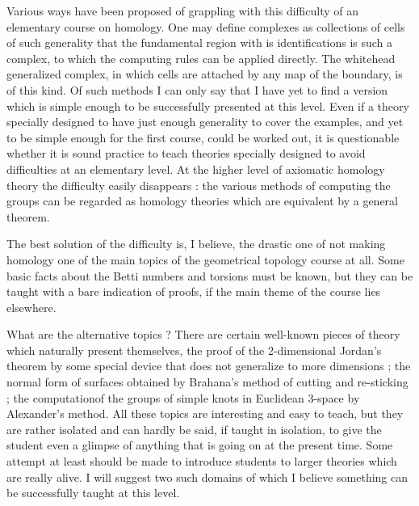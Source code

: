 Various ways have been proposed of grappling with this difficulty of
an elementary course on homology. One may define complexes as
collections of cells of such generality that the fundamental region
with is identifications is such a complex, to which the computing
rules can be applied directly. The whitehead generalized complex, in
which cells are attached by any map of the boundary, is of this
kind. Of such methods I can only say that I have yet to find a version
which is simple enough to be successfully presented at this
level. Even if a theory specially designed to have just enough
generality to cover the examples, and yet to be simple enough for the
first course, could be worked out, it is questionable whether it is
sound practice to teach theories specially designed to avoid
difficulties at an elementary level. At the higher level of axiomatic
homology theory the difficulty easily disappears : the various methods
of computing the groups can be regarded as homology theories which are
equivalent by a general theorem.

The best solution of the difficulty is, I believe, the drastic one of
not making homology one of the main topics of the geometrical topology
course at all. Some basic facts about the Betti numbers and torsions
must be known, but they can be taught with a bare indication of
proofs, if the main theme of the course lies elsewhere.

What are the alternative topics ? There are certain well-known pieces
of theory which naturally present themselves, the proof of the
2-dimensional Jordan's theorem by some special device that does not
generalize to more dimensions ; the normal form of surfaces obtained
by Brahana's method of cutting and re-sticking ; the
computation\pageoriginale  of the groups of simple knots in Euclidean
3-space by Alexander's method. All these topics are interesting and
easy to teach, but they are rather isolated and can hardly be said, if
taught in isolation, to give the student even a glimpse of anything
that is going on at the present time. Some attempt at least should be
made to introduce students to larger theories which are really
alive. I will suggest two such domains of which I believe something
can be successfully taught at this level.

